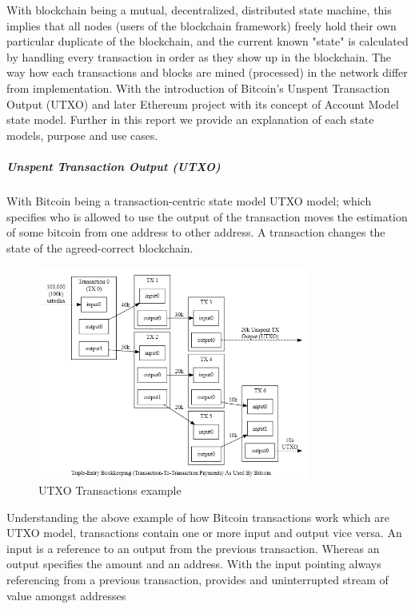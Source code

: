 With blockchain being a mutual, decentralized, distributed state machine, this implies that all nodes (users of the blockchain framework) freely hold their own particular duplicate of the blockchain, and the current known "state" is calculated by handling every transaction in order as they show up in the blockchain. The way how each transactions and blocks are mined (processed) in the network differ from implementation. With the introduction of Bitcoin’s Unspent Transaction Output (UTXO) and later Ethereum project with its concept of Account Model state model. Further in this report we provide an explanation of each state models, purpose and use cases.

\subparagraph{Unspent Transaction Output (UTXO)}

With Bitcoin being a transaction-centric state model UTXO model; which specifies who is allowed to use the output of the transaction moves the estimation of some bitcoin from one address to other address. A transaction changes the state of the agreed-correct blockchain. 

\begin{figure}[h]
\centering
\includegraphics[width=0.8\textwidth]{images/UTXO.png}
\caption{\label{fig:UTXO}UTXO Transactions example}
\end{figure}

Understanding the above example of how Bitcoin transactions work which are UTXO model, transactions contain one or more input and output vice versa. An input is a reference to an output from the previous transaction. Whereas an output specifies the amount and an address. With the input pointing always referencing from a previous transaction, provides and uninterrupted stream of value amongst addresses

